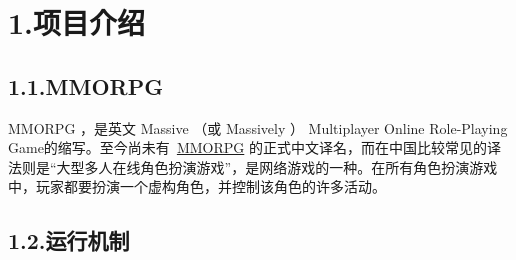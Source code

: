 \documentclass{article}
\begin{document}
\begin{mdtoc}
\begin{mdtocblock}
\begin{mdtocblock}


\end{mdtocblock}%


\begin{mdtocblock}%



\end{mdtocblock}%
\end{mdtocblock}%
\end{mdtoc}%
\newpage

\section{1.\hspace*{0.5em}项目介绍}\label{1}%

\subsection{1.1.\hspace*{0.5em}MMORPG}\label{12}%

\noindent{}MMORPG ，是英文 Massive （或 Massively ） Multiplayer Online Role-Playing Game的缩写。至今尚未有~\href{https://baike.baidu.com/item/MMORPG}{MMORPG} 的正式中文译名，而在中国比较常见的译法则是\textquotedblleft{}大型多人在线角色扮演游戏\textquotedblright{}，是网络游戏的一种。在所有角色扮演游戏中，玩家都要扮演一个虚构角色，并控制该角色的许多活动。%

\subsection{1.2.\hspace*{0.5em}运行机制}\label{13}%
\end{document}
